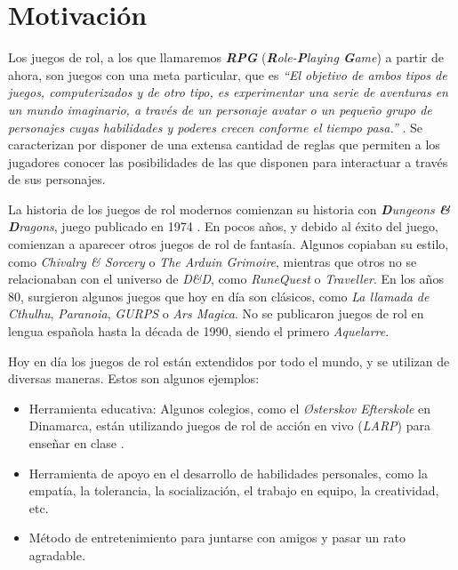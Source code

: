 

\section{Motivación} \label{Motivacion}
Los juegos de rol, a los que llamaremos \textbf{\textit{RPG}} (\textit{\textbf{R}ole-\textbf{P}laying \textbf{G}ame}) a 
partir de ahora, son juegos con una meta particular, que es \textit{“El objetivo de ambos tipos de juegos, computerizados y 
de otro tipo, es experimentar una serie de aventuras en un mundo imaginario, a través de un personaje avatar o un pequeño grupo de 
personajes cuyas habilidades y poderes crecen conforme el tiempo pasa.”} \autocite*{Adams2010}. Se caracterizan por 
disponer de una extensa cantidad de reglas que permiten a los jugadores conocer las posibilidades de las que disponen para 
interactuar a través de sus personajes.
\medskip

La historia de los juegos de rol modernos comienzan su historia con \textit{\textbf{D}ungeons \textbf{\&} \textbf{D}ragons}, 
juego publicado en 1974 \autocite*{HistoriaRPG}. En pocos años, y debido al éxito del juego, comienzan a aparecer otros juegos de rol de fantasía. 
Algunos copiaban su estilo, como \textit{Chivalry \& Sorcery} o \textit{The Arduin Grimoire}, mientras que otros no se 
relacionaban con el universo de \textit{D\&D}, como \textit{RuneQuest} o \textit{Traveller}. En los años 80, surgieron 
algunos juegos que hoy en día son clásicos, como \textit{La llamada de Cthulhu}, \textit{Paranoia}, \textit{GURPS} o \textit{Ars Magica}.
No se publicaron juegos de rol en lengua española hasta la década de 1990, siendo el primero \textit{Aquelarre}.\medskip

Hoy en día los juegos de rol están extendidos por todo el mundo, y se utilizan de diversas maneras. Estos son algunos ejemplos:
\begin{itemize}
    \item Herramienta educativa: Algunos colegios, como el \textit{Østerskov Efterskole} en Dinamarca, están utilizando juegos de 
    rol de acción en vivo (\textit{LARP}) para enseñar en clase \autocite*{LARPSchool}.
    \item Herramienta de apoyo en el desarrollo de habilidades personales, como la empatía, la tolerancia, la socialización, el trabajo
    en equipo, la creatividad, etc.
    \item Método de entretenimiento para juntarse con amigos y pasar un rato agradable.
\end{itemize}


